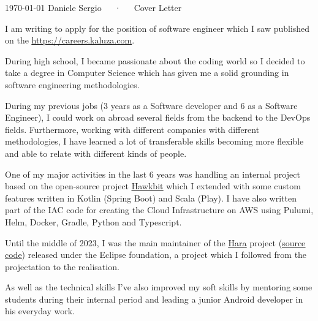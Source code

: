 \documentclass[11pt, a4paper]{awesome-cv}
\begin{document}
\makecvheader[R]

\makecvfooter
  {\today}
  {Daniele Sergio~~~·~~~Cover Letter}
  {}

\makelettertitle

\begin{cvletter}
I am writing to apply for the position of software engineer which I saw published on the \href{https://careers.kaluza.com/software-engineer/4240228101}{\underline{https://careers.kaluza.com}}.

During high school, I became passionate about the coding world so I decided to take a degree in Computer Science which has given me a solid grounding in software engineering methodologies.

During my previous jobs (3 years as a Software developer and 6 as a Software Engineer), I could work on abroad several fields from the backend to the DevOps fields. Furthermore, working with different companies with different methodologies, I have learned a lot of transferable skills becoming more flexible and able to relate with different kinds of people.

One of my major activities in the last 6 years was handling an internal project based on the open-source project \href{https://eclipse.dev/hawkbit/}{\underline{Hawkbit}} which I extended with some custom features written in Kotlin (Spring Boot) and Scala (Play). I have also written part of the IAC code for creating the Cloud Infrastructure on AWS using Pulumi, Helm, Docker, Gradle, Python and Typescript.

Until the middle of 2023, I was the main maintainer of the \href{https://projects.eclipse.org/projects/iot.hawkbit.hara}{\underline{Hara}} project (\href{https://github.com/eclipse-hara/hara-ddiclient}{\underline{source code}}) released under the Eclipse foundation, a project which I followed from the projectation to the realisation.

As well as the technical skills I’ve also improved my soft skills by mentoring some students during their internal period and leading a junior Android developer in his everyday work.


\end{cvletter}
\end{document}
